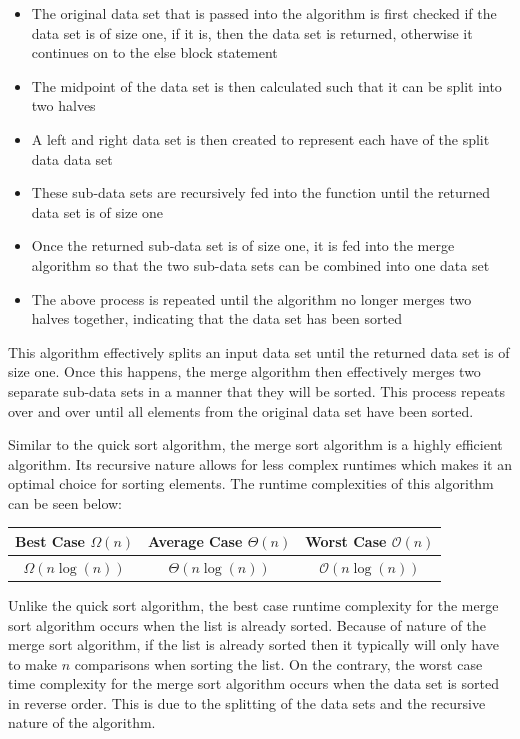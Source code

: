 \documentclass[a4paper,9pt]{article}
\begin{document}
\begin{highlight}
    \begin{itemize}
        \item The original data set that is passed into the algorithm is first checked if the data set is of size one, if it is, then the data set is returned, otherwise it continues on to the else block statement
        \item The midpoint of the data set is then calculated such that it can be split into two halves
        \item A left and right data set is then created to represent each have of the split data data set
        \item These sub-data sets are recursively fed into the function until the returned data set is of size one
        \item Once the returned sub-data set is of size one, it is fed into the merge algorithm so that the two sub-data sets can be combined into one data set
        \item The above process is repeated until the algorithm no longer merges two halves together, indicating that the data set has been sorted
    \end{itemize}

    \noindent This algorithm effectively splits an input data set until the returned data set is of size one. Once this happens, the merge algorithm then effectively merges two separate sub-data sets in a manner that they will be sorted. This process repeats over and over until all elements from the original data set have been sorted.

    Similar to the quick sort algorithm, the merge sort algorithm is a highly efficient algorithm. Its recursive nature allows for less complex runtimes which makes it an optimal choice for sorting elements. The runtime complexities of this algorithm can be seen below:

    \begin{center}
        \begin{tabular}{|c|c|c|}
            \hline \textbf{Best Case $\Omega(n)$} & \textbf{Average Case $\Theta(n)$} & \textbf{Worst Case $\mathcal{O}(n)$} \\ \hline
            $\Omega(n\log{(n)})$ & $\Theta(n\log{(n)})$ & $\mathcal{O}(n\log{(n)})$ \\ \hline
        \end{tabular}
    \end{center}

    \noindent Unlike the quick sort algorithm, the best case runtime complexity for the merge sort algorithm occurs when the list is already sorted. Because of nature of the merge sort algorithm, if the list is already sorted then it typically will only have to make $n$ comparisons when sorting the list. On the contrary, the worst case time complexity
    for the merge sort algorithm occurs when the data set is sorted in reverse order. This is due to the splitting of the data sets and the recursive nature of the algorithm. 
    

\end{highlight}
\end{document}
